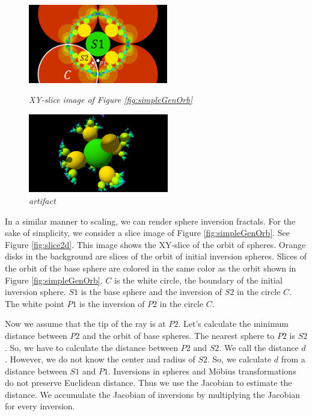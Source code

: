 \begin{figure}[htbp]
 \begin{minipage}[t]{0.5\hsize}
  \center
  \includegraphics[height=1.35in, keepaspectratio]{img/preparation/slice.png}
  \caption{\textit{XY-slice image of Figure \ref{fig:simpleGenOrb}}}
  \label{fig:slice2d}
  \hspace*{\fill}
 \end{minipage}
 \begin{minipage}[t]{0.5\hsize}
  \center
  \includegraphics[height=1.35in, keepaspectratio]{img/preparation/artifact.pdf}
  \caption{\textit{artifact}}
  \label{fig:3dartifact}
  \hspace*{\fill}
 \end{minipage}
\end{figure}

In a similar manner to scaling, we can render sphere inversion
fractals.
For the sake of simplicity, we consider a slice image of Figure
\ref{fig:simpleGenOrb}.
See Figure \ref{fig:slice2d}. This image shows the XY-slice of the orbit
of spheres.
Orange disks in the background  are slices of the orbit of initial inversion spheres.
Slices of the orbit of the base sphere are colored in
the same color as the orbit shown in Figure \ref{fig:simpleGenOrb}.
$C$ is the white circle, the boundary of the initial inversion sphere.
$S1$ is the base sphere and the inversion of $S2$ in the circle $C$. 
The white point $P1$ is the inversion of $P2$ in the circle $C$.

Now we assume that the tip of the ray is at $P2$.
Let's calculate the minimum distance between
$P2$ and the orbit of base spheres.
The nearest sphere to $P2$ is $S2$.
So, we have to calculate the distance between $P2$ and $S2$.
We call the distance $d$.
However, we do not know the center and radius of $S2$.
So, we calculate $d$ from a distance between $S1$ and $P1$.
Inversions in spheres and M\"obius transformations do not preserve
Euclidean distance.
Thus we use the Jacobian to estimate the distance.
We accumulate the Jacobian of inversions by multiplying the Jacobian for
every inversion.

